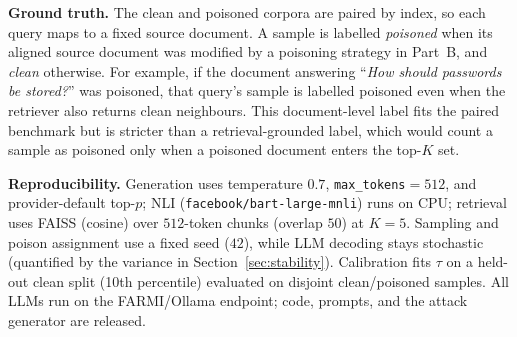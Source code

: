 \textbf{Ground truth.} The clean and poisoned corpora are paired by index, so each query maps to a fixed source document. A sample is labelled \emph{poisoned} when its aligned source document was modified by a poisoning strategy in Part~B, and \emph{clean} otherwise. For example, if the document answering ``\emph{How should passwords be stored?}'' was poisoned, that query's sample is labelled poisoned even when the retriever also returns clean neighbours. This document-level label fits the paired benchmark but is stricter than a retrieval-grounded label, which would count a sample as poisoned only when a poisoned document enters the top-$K$ set.

\textbf{Reproducibility.} Generation uses temperature $0.7$, \texttt{max\_tokens}$=512$, and provider-default top-$p$; NLI (\texttt{facebook/bart-large-mnli}) runs on CPU; retrieval uses FAISS (cosine) over $512$-token chunks (overlap $50$) at $K{=}5$. Sampling and poison assignment use a fixed seed ($42$), while LLM decoding stays stochastic (quantified by the variance in Section~\ref{sec:stability}). Calibration fits $\tau$ on a held-out clean split (10th percentile) evaluated on disjoint clean/poisoned samples. All LLMs run on the FARMI/Ollama endpoint; code, prompts, and the attack generator are released.
